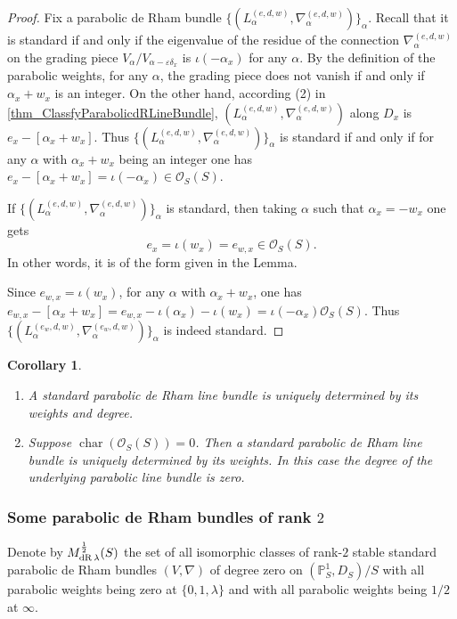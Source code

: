\documentclass[12pt,twoside]{book}
\theoremstyle{plain}
\newtheorem{corollary}[corollary]{Corollary}
\theoremstyle{definition}
\theoremstyle{remark}
\newcommand{\bP}{{\mathbb P}}
\newcommand{\mO}{{\mathcal O}}
\DeclareMathOperator\Char{char}
\numberwithin{equation}{section}
\def\MdRh{{M^{{1\over 2}}_{{\rm dR}\,\lambda}}}
\begin{document}
\begin{proof}
Fix a parabolic de Rham bundle $\{(L^{(e,d,w)}_\alpha,\nabla^{(e,d,w)}_\alpha)\}_{\alpha}$.
Recall that it is standard if and only if the eigenvalue of the residue of the connection $\nabla^{(e,d,w)}_\alpha$ on the grading piece $V_\alpha/V_{\alpha-\varepsilon\delta_x}$ is $\iota(-\alpha_x)$ for any $\alpha$. By the definition of the parabolic weights, for any $\alpha$, the grading piece does not vanish if and only if $\alpha_x+w_x$ is an integer. On the other hand, according (2) in \autoref{thm_ClassfyParabolicdRLineBundle}, $(L^{(e,d,w)}_\alpha,\nabla^{(e,d,w)}_\alpha)$ along $D_x$ is $e_{x}-[\alpha_x+w_x]$. Thus $\{(L^{(e,d,w)}_\alpha,\nabla^{(e,d,w)}_\alpha)\}_{\alpha}$ is standard if and only if for any $\alpha$ with $\alpha_x+w_x$ being an integer one has $e_{x}-[\alpha_x+w_x]=\iota(-\alpha_x) \in \mO_S(S)$.

If $\{(L^{(e,d,w)}_\alpha,\nabla^{(e,d,w)}_\alpha)\}_{\alpha}$ is standard, then taking $\alpha$ such that $\alpha_x = -w_x$ one gets
\[e_x = \iota(w_x)=e_{w,x} \in \mO_S(S).\]
In other words, it is of the form given in the Lemma.

Since $e_{w,x}=\iota(w_x)$, for any $\alpha$ with $\alpha_x+w_x$, one has $e_{w,x}-[\alpha_x+w_x]= e_{w,x} - \iota(\alpha_x) - \iota(w_x) =\iota(-\alpha_x) \mO_S(S)$. Thus $\{(L^{(e_w,d,w)}_\alpha,\nabla^{(e_w,d,w)}_\alpha)\}_{\alpha}$ is indeed standard.
\end{proof}

\begin{corollary}
\begin{enumerate}
\item[$(1)$] A standard parabolic de Rham line bundle is uniquely determined by its weights and degree.
\item[$(2)$] Suppose $\Char(\mO_S(S))=0$. Then a standard parabolic de Rham line bundle is uniquely determined by its weights. In this case the degree of the underlying parabolic line bundle is zero.
\end{enumerate}
\end{corollary}

\subsubsection{Some parabolic de Rham bundles of rank $2$}

Denote by \emph{$\MdRh(S)$} the set of all isomorphic classes of rank-$2$ stable standard parabolic de Rham bundles $(V,\nabla)$ of degree zero on $(\bP^1_S,D_S)/S$ with all parabolic weights being zero at $\{0,1,\lambda\}$ and with all parabolic weights being $1/2$ at $\infty$.
\end{document}

